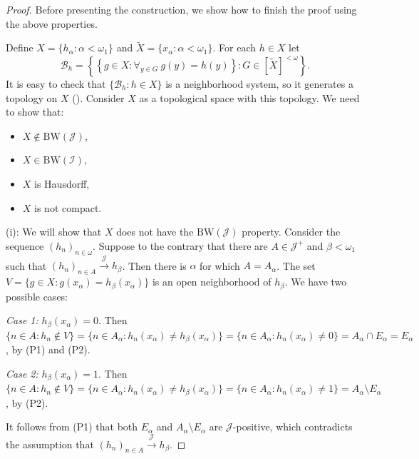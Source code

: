 \documentclass{amsart}
\theoremstyle{plain}
\theoremstyle{definition}
\theoremstyle{remark}
\newcommand{\cB}{\mathcal{B}}
\newcommand{\cI}{\mathcal{I}}
\newcommand{\I}{\cI}
\newcommand{\cJ}{\mathcal{J}}
\newcommand{\J}{\cJ}
\newcommand{\BW}{\mathrm{BW}}
\begin{document}
\begin{proof}
\medskip

Before presenting the construction, we show how to finish the proof using the above properties. 

Define $X=\{h_\alpha: \alpha<\omega_1\}$ and $\tilde{X}=\{x_\alpha:\alpha<\omega_1\}$. For each $h\in X$ let 
\[
\cB_h=\left\{\left\{g\in X: \forall_{y\in G}\ g(y)=h(y)\right\}: G\in[\tilde{X}]^{<\omega}\right\}.
\]
It is easy to check that $\{\cB_h: h\in X\}$ is a neighborhood system, so it generates a topology on $X$ (\cite[Proposition 1.2.3]{MR1039321}). Consider $X$ as a topological space with this topology. We need to show that:
\begin{itemize}
    \item[(i)] $X\notin\BW(\J)$,
    \item[(ii)] $X\in\BW(\I)$,
    \item[(iii)] $X$ is Hausdorff,
    \item[(iv)] $X$ is not compact.
\end{itemize}

(i): We will show that $X$ does not have the $\BW(\J)$ property. Consider the sequence $(h_n)_{n \in \omega}$. Suppose to the contrary that there are $A\in \J^+$ and $\beta<\omega_1$ such that $(h_n)_{n \in A} \overset{\J}{\longrightarrow}h_\beta$. Then there is $\alpha$ for which $A=A_\alpha$. The set $V=\{g \in X: g(x_\alpha)=h_\beta(x_\alpha)\}$ is an open neighborhood of $h_\beta$. We have two possible cases: 

\smallskip

\textit{Case 1:} $h_\beta(x_\alpha)=0$. Then $\{ n \in A: h_n\notin V\}=\{n \in A_\alpha: h_n(x_\alpha)\neq h_\beta(x_\alpha)\}=\{n \in A_\alpha: h_n(x_\alpha)\neq 0\}=A_\alpha\cap E_\alpha=E_\alpha$, by (P1) and (P2).

\smallskip

\textit{Case 2:} $h_\beta(x_\alpha)=1$. Then $\{ n \in A: h_n\notin V\}=\{n \in A_\alpha: h_n(x_\alpha)\neq h_\beta(x_\alpha)\}=\{n \in A_\alpha: h_n(x_\alpha)\neq 1\}=A_\alpha \setminus E_\alpha$, by (P2).

\smallskip

It follows from (P1) that both $E_\alpha$ and $A_\alpha \setminus E_\alpha$ are $\J$-positive, which contradicts the assumption that $(h_n)_{n \in A} \overset{\J}{\longrightarrow}h_\beta$.

\medskip


\end{proof}
\end{document}
